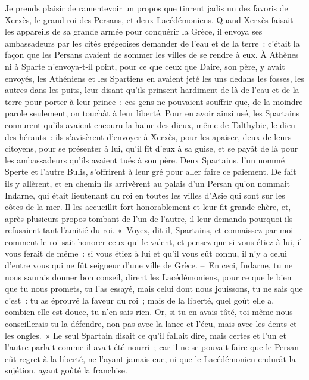 \documentclass[french,twoside]{book} %
\begin{document}
Je prends plaisir de ramentevoir un propos que tinrent jadis un des favoris de Xerxès, le grand roi des Persans, et deux Lacédémoniens. Quand Xerxès faisait les appareils de sa grande armée pour conquérir la Grèce, il envoya ses ambassadeurs par les cités grégeoises demander de l’eau et de la terre : c’était la façon que les Persans avaient de sommer les villes de se rendre à eux. À Athènes ni à Sparte n’envoya-t-il point, pour ce que ceux que Daire, son père, y avait envoyés, les Athéniens et les Spartiens en avaient jeté les uns dedans les fosses, les autres dans les puits, leur disant qu’ils prinsent hardiment de là de l’eau et de la terre pour porter à leur prince : ces gens ne pouvaient souffrir que, de la moindre parole seulement, on touchât à leur liberté. Pour en avoir ainsi usé, les Spartains connurent qu’ils avaient encouru la haine des dieux, même de Talthybie, le dieu des hérauts : ils s’avisèrent d’envoyer à Xerxès, pour les apaiser, deux de leurs citoyens, pour se présenter à lui, qu’il fît d’eux à sa guise, et se payât de là pour les ambassadeurs qu’ils avaient tués à son père. Deux Spartains, l’un nommé Sperte et l’autre Bulis, s’offrirent à leur gré pour aller faire ce paiement. De fait ils y allèrent, et en chemin ils arrivèrent au palais d’un Persan qu’on nommait Indarne, qui était lieutenant du roi en toutes les villes d’Asie qui sont sur les côtes de la mer. Il les accueillit fort honorablement et leur fit grande chère, et, après plusieurs propos tombant de l’un de l’autre, il leur demanda pourquoi ils refusaient tant l’amitié du roi. « Voyez, dit-il, Spartains, et connaissez par moi comment le roi sait honorer ceux qui le valent, et pensez que si vous étiez à lui, il vous ferait de même : si vous étiez à lui et qu’il vous eût connu, il n’y a celui d’entre vous qui ne fût seigneur d’une ville de Grèce. – En ceci, Indarne, tu ne nous saurais donner bon conseil, dirent les Lacédémoniens, pour ce que le bien que tu nous promets, tu l’as essayé, mais celui dont nous jouissons, tu ne sais que c’est : tu as éprouvé la faveur du roi ; mais de la liberté, quel goût elle a, combien elle est douce, tu n’en sais rien. Or, si tu en avais tâté, toi-même nous conseillerais-tu la défendre, non pas avec la lance et l’écu, mais avec les dents et les ongles. » Le seul Spartain disait ce qu’il fallait dire, mais certes et l’un et l’autre parlait comme il avait été nourri ; car il ne se pouvait faire que le Persan eût regret à la liberté, ne l’ayant jamais eue, ni que le Lacédémonien endurât la sujétion, ayant goûté la franchise.\par
\end{document}
